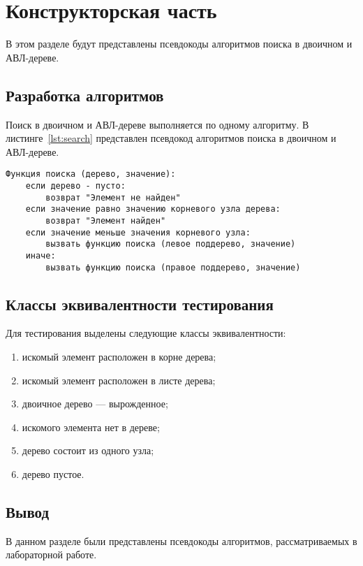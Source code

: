 \chapter{Конструкторская часть}

В этом разделе будут представлены псевдокоды алгоритмов поиска в двоичном и АВЛ-дереве.

\section{Разработка алгоритмов}

Поиск в двоичном и АВЛ-дереве выполняется по одному алгоритму. В листинге~\ref{lst:search} представлен псевдокод алгоритмов поиска в двоичном и АВЛ-дереве.

\begin{center}
	\captionsetup{justification=raggedright,singlelinecheck=off}
	\begin{lstlisting}[label=lst:search,caption=Псевдокод алгоритма поиска в двоичном (АВЛ) дереве]
Функция поиска (дерево, значение):
	если дерево - пусто:
		возврат "Элемент не найден"
	если значение равно значению корневого узла дерева:
		возврат "Элемент найден"
	если значение меньше значения корневого узла:
		вызвать функцию поиска (левое поддерево, значение)
	иначе:
		вызвать функцию поиска (правое поддерево, значение)
	\end{lstlisting}
\end{center}

\section{Классы эквивалентности тестирования}

Для тестирования выделены следующие классы эквивалентности:
\begin{enumerate}
	\item искомый элемент расположен в корне дерева;
	\item искомый элемент расположен в листе дерева;
	\item двоичное дерево --- вырожденное;
	\item искомого элемента нет в дереве;
	\item дерево состоит из одного узла;
	\item дерево пустое.
\end{enumerate}

\section{Вывод}

В данном разделе были представлены псевдокоды алгоритмов, рассматриваемых в лабораторной работе.